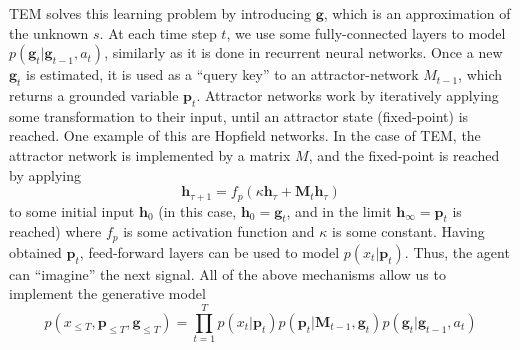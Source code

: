 \documentclass[oneside,english,logo]{amuthesis}
\begin{document}
TEM solves this learning problem by introducing  $\boldsymbol{g}$, which is an approximation of the unknown $s$. At each time step $t$, we use some fully-connected layers to model $p(\boldsymbol{g}_{t}|\boldsymbol{g}_{t-1},a_t)$, similarly as it is done in recurrent neural networks. Once a new $\boldsymbol{g}_{t}$ is estimated, it is used as a ``query key'' to an attractor-network $M_{t-1}$, which returns a grounded variable $\boldsymbol{p}_{t}$. Attractor networks work by iteratively applying some transformation to their input, until an attractor state (fixed-point) is reached. One example of this are Hopfield networks. In the case of TEM, the attractor network is implemented by a matrix $M$, and the fixed-point is reached by applying
\[
\boldsymbol{h}_{\tau+1} = f_p(\kappa \boldsymbol{h}_{\tau}+\boldsymbol{M}_t \boldsymbol{h}_{\tau})
\]
to some initial input $\boldsymbol{h}_0$ (in this case, $\boldsymbol{h}_0=\boldsymbol{g}_{t}$, and in the limit $\boldsymbol{h}_{\infty}=\boldsymbol{p}_{t}$ is reached) where $f_p$ is some activation function and $\kappa$ is some constant. Having obtained $\boldsymbol{p}_{t}$,  feed-forward layers can be used to model $p(x_{t}| \boldsymbol{p}_{t})$. Thus, the agent can ``imagine'' the next signal. All of the above mechanisms allow us to implement the generative model
\[
p(x_{\le T},\boldsymbol{p}_{\le T}, \boldsymbol{g}_{\le T}) = \prod_{t=1}^T p(x_{t}|\boldsymbol{p}_{t}) p(\boldsymbol{p}_{t}|\boldsymbol{M}_{t-1},\boldsymbol{g}_{t})p(\boldsymbol{g}_{t}|\boldsymbol{g}_{t-1},a_t)
\]
\end{document}

